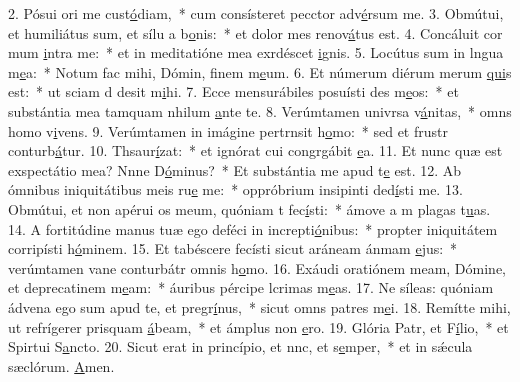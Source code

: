 2. Pósui ori me cust\uline{ó}diam,~* cum consísteret pecctor adv\uline{é}rsum me.
3. Obmútui, et humiliátus sum, et sílu a b\uline{o}nis:~* et dolor mes renov\uline{á}tus est.
4. Concáluit cor mum \uline{i}ntra me:~* et in meditatióne mea exrdéscet \uline{i}gnis.
5. Locútus sum in lngua m\uline{e}a:~* Notum fac mihi, Dómin, finem m\uline{e}um.
6. Et númerum diérum merum \uline{qui}s est:~* ut sciam d desit m\uline{i}hi.
7. Ecce mensurábiles posuísti des m\uline{e}os:~* et substántia mea tamquam nhilum \uline{a}nte te.
8. Verúmtamen univrsa v\uline{á}nitas,~* omns homo v\uline{i}vens.
9. Verúmtamen in imágine pertrnsit h\uline{o}mo:~* sed et frustr conturb\uline{á}tur.
10. Thsaur\uline{í}zat:~* et ignórat cui congrgábit \uline{e}a.
11. Et nunc quæ est exspectátio mea? Nnne D\uline{ó}minus?~* Et substántia me apud t\uline{e} est.
12. Ab ómnibus iniquitátibus meis ru\uline{e} me:~* oppróbrium insipinti ded\uline{í}sti me.
13. Obmútui, et non apérui os meum, quóniam t fec\uline{í}sti:~* ámove a m plagas t\uline{u}as.
14. A fortitúdine manus tuæ ego deféci in increpti\uline{ó}nibus:~* propter iniquitátem corripísti h\uline{ó}minem.
15. Et tabéscere fecísti sicut aráneam ánmam \uline{e}jus:~* verúmtamen vane conturbátr omnis h\uline{o}mo.
16. Exáudi oratiónem meam, Dómine, et deprecatinem m\uline{e}am:~* áuribus pércipe lcrimas m\uline{e}as.
17. Ne síleas: quóniam ádvena ego sum apud te, et pregr\uline{í}nus,~* sicut omns patres m\uline{e}i.
18. Remítte mihi, ut refrígerer prisquam \uline{á}beam,~* et ámplus non \uline{e}ro.
19. Glória Patr, et F\uline{í}lio,~* et Spirtui S\uline{a}ncto.
20. Sicut erat in princípio, et nnc, et s\uline{e}mper,~* et in sǽcula sæclórum. \uline{A}men.
